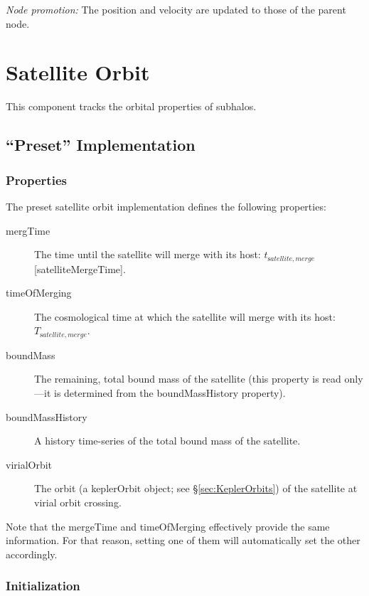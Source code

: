 \noindent\emph{Node promotion:} The position and velocity are updated to those of the parent node.\\

\section{Satellite Orbit}

This \gls{component} tracks the orbital properties of subhalos.

\subsection{``Preset'' Implementation}

\subsubsection{Properties}

The preset satellite orbit implementation defines the following properties:
\begin{description}
 \item [{\normalfont \ttfamily mergTime}] The time until the satellite will merge with its host: $t_{\mathrm satellite, merge}$ [{\normalfont \ttfamily satelliteMergeTime}].
 \item [{\normalfont \ttfamily timeOfMerging}] The cosmological time at which the satellite will merge with its host: $T_{\mathrm satellite, merge}$.
 \item [{\normalfont \ttfamily boundMass}] The remaining, total bound mass of the satellite (this property is read only---it is determined from the {\normalfont \ttfamily boundMassHistory} property).
 \item [{\normalfont \ttfamily boundMassHistory}] A history time-series of the total bound mass of the satellite.
 \item [{\normalfont \ttfamily virialOrbit}] The orbit (a {\normalfont \ttfamily keplerOrbit} object; see \S\ref{sec:KeplerOrbits}) of the satellite at virial orbit crossing.
\end{description}

Note that the {\normalfont \ttfamily mergeTime} and {\normalfont \ttfamily timeOfMerging} effectively provide the same information. For that reason, setting one of them will automatically set the other accordingly.

\subsubsection{Initialization}

